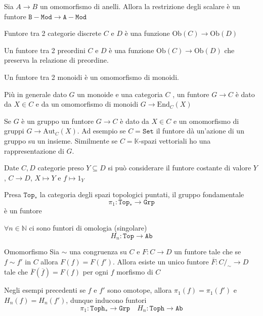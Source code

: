 \begin{example}{}
    Sia \(A \to B\) un omomorfismo di anelli. Allora la restrizione degli
    scalare è un funtore \(\mathtt{B-Mod} \to \mathtt{A-Mod}\) 
\end{example}


\begin{example}{}
    Funtore tra 2 categorie discrete \(C\) e \(D\) è una funzione \(\mathrm{Ob}{(C)} \to \mathrm{Ob}{(D)}\) 
\end{example}

\begin{example}{}
    Un funtore tra 2 preordini \(C\) e \(D\) è una funzione \(\mathrm{Ob}{(C)} \to \mathrm{Ob}{(D)}\)  che preserva la relazione di preordine.
\end{example}

\begin{example}{}
    Un funtore tra 2 monoidi è un omomorfismo di monoidi.

    Più in generale dato \(G\)  un monoide e una categoria \(C\) , un funtore \(G \to C\) è dato da \(X \in C\) e da un omomorfismo di monoidi \(G \to \mathrm{End}_C{(X)}\) 

    Se \(G\) è un gruppo un funtore \(G \to C\) è dato da \(X \in C\) e un
    omomorfismo di gruppi \(G \to \mathrm{Aut}_C{(X)}\). Ad esempio se \(C = \mathtt{Set}\) il funtore dà un'azione di un gruppo su un insieme.
    Similmente se \(C = \mathbb{K}\)-spazi vettoriali ho una rappresentazione di
    \(G\).
\end{example}

\begin{example}
    Date \(C, D\) categorie preso \(Y \subseteq D \) si può considerare il
    funtore costante di valore \(Y\), \(C \to D\), \(X \mapsto Y\) e \(f \mapsto 1_Y\) 
\end{example}

\begin{example}{}
    Presa \(\mathtt{Top}_*\) la categoria degli spazi topologici puntati, il
    gruppo fondamentale 
    \[
        \pi_{1} : \mathtt{Top}_* \to \mathtt{Grp}
    \]
    è un funtore
\end{example}

\begin{example}{}
    \(\forall n \in \mathbb{N}\) ci sono funtori di omologia (singolare)
    \[
      H_{n} : \mathtt{Top} \to \mathtt{Ab}
    \]
\end{example}
\begin{theorem}{Omomorfismo}
    Sia \(\sim \) una congruenza su \(C\) e \(F : C \to D\) un funtore tale che
    se \(f \sim f'\) in \(C\) allora \(F{(f)} = F{(f')}\).
    Allora esiste un unico funtore \(\overline{F} : C /_\sim \to D\) tale
    che \(\overline{F}{(\overline{f})} = F{(f)}\) per ogni \(f\) morfismo di \(C\) 
\end{theorem}
\begin{example}{}
    Negli esempi precedenti se \(f\) e \(f'\) sono omotope, allora \(\pi_{1}{(f)} = \pi_{1}{(f')}\) e \(H_{n}{(f)} = H_{n}{(f')}\), dunque inducono funtori
    \[
      \pi_{1} : \mathtt{Toph}_* \to \mathtt{Grp} \quad H_{n} : \mathtt{Toph} \to \mathtt{Ab}
    \]
\end{example}

